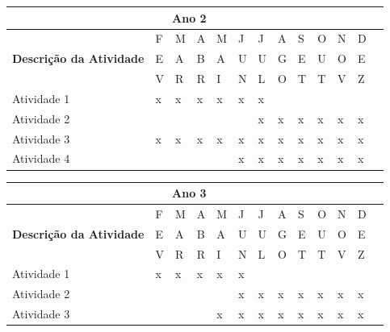 \documentclass[
  12pt,				
  openright,	
  twoside,	
  a4paper,
  brazil,	
  oldfontcommands,
  ]{abntex2}
\begin{document}
\begin{table}[H]
\begin{center}
\begin{tabularx}{\textwidth}{|p{10cm}|X|X|X|X|X|X|X|X|X|X|X|X|}
\hline
\multicolumn{12}{|c|}{\cellcolor{green} \textbf{Ano 2}} \\\hline
\multirow{3}{*}{\textbf{Descri\c{c}\~{a}o da Atividade}} 
                                                         	& F & M & A & M & J & J & A & S & O & N & D \\
                                                         	& E & A & B & A & U & U & G & E & U & O & E \\
                                                         	& V & R & R & I & N & L & O & T & T & V & Z \\\hline
Atividade 1                                     	& x & x & x & x & x & x &   &   &   &   &   \\\hline
Atividade 2	                     		&   &   &   &   &   & x  & x  & x  & x  & x  & x  \\\hline
Atividade 3			                 & x & x & x & x & x & x  & x  & x  & x  & x  & x  \\\hline
Atividade 4					&   &   &   &   & x  &  x & x  & x &  x & x &  x \\\hline
\end{tabularx}
\end{center}
\end{table}
\vspace{-10mm}

\begin{table}[H]
\begin{center}
\begin{tabularx}{\textwidth}{|p{10cm}|X|X|X|X|X|X|X|X|X|X|X|X|}
\hline
\multicolumn{12}{|c|}{\cellcolor{green} \textbf{Ano 3}} \\\hline
\multirow{3}{*}{\textbf{Descri\c{c}\~{a}o da Atividade}} 
                                             		& F & M & A & M & J & J & A & S & O & N & D \\
                                                     	& E & A & B & A & U & U & G & E & U & O & E \\
                                                     	& V & R & R & I & N & L & O & T & T & V & Z \\\hline
Atividade 1				   	& x  & x  & x  & x  & x  &   &   &   &   &   &   \\\hline
Atividade 2				 	&   &   &   &   & x & x &  x & x  & x  &  x &  x \\\hline
Atividade 3	                              	&   &   &   & x  & x   & x  & x  & x  & x  & x  & x   \\\hline
\end{tabularx}
\end{center}
\end{table}
\vspace{-10mm}
\end{document}
